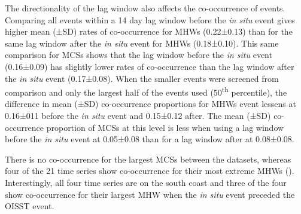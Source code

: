 \documentclass[a4paper,10pt,review]{elsarticle}
\begin{document}
The directionality of the lag window also affects the co-occurrence of events. Comparing all events within a 14 day lag window before the \emph{in situ} event gives higher mean (±SD) rates of co-occurrence for MHWs (0.22±0.13) than for the same lag window after the \emph{in situ} event for MHWs (0.18±0.10). This same comparison for MCSs shows that the lag window before the \emph{in situ} event (0.16±0.09) has slightly lower rates of co-occurrence than the lag window after the \emph{in situ} event (0.17±0.08). When the smaller events were screened from comparison and only the largest half of the events used (50\textsuperscript{th} percentile), the difference in mean (±SD) co-occurrence proportions for MHWs event lessens at 0.16±011 before the \emph{in situ} event and 0.15±0.12 after. The mean (±SD) co-occurrence proportion of MCSs at this level is less when using a lag window before the \emph{in situ} event at 0.05±0.08 than for a lag window after at 0.08±0.08.

There is no co-occurrence for the largest MCSs between the datasets, whereas four of the 21 time series show co-occurrence for their most extreme MHWs (). Interestingly, all four time series are on the south coast and three of the four show co-occurrence for their largest MHW when the \emph{in situ} event preceded the OISST event.
\end{document}
